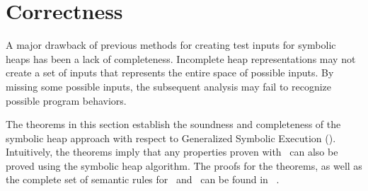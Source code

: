 \section{Correctness}
\label{sec:bisim}
A major drawback of previous methods for creating test inputs for
symbolic heaps has been a lack of completeness. Incomplete heap
representations may not create a set of inputs that represents
the entire space of possible inputs. By missing some possible
inputs, the subsequent analysis may fail to recognize 
possible program behaviors. 

The theorems in this section establish the soundness and
completeness of the symbolic heap approach with respect to Generalized
Symbolic Execution (\gsetxt{}). Intuitively, the theorems imply that any properties proven
with~\gsetxt{} can also be proved using the symbolic heap
algorithm. The proofs for the theorems, as well as
the complete set of semantic rules for~\gsetxt{} and~\symtxt{} can
be found in ~\cite{Hillery:2015}. 


